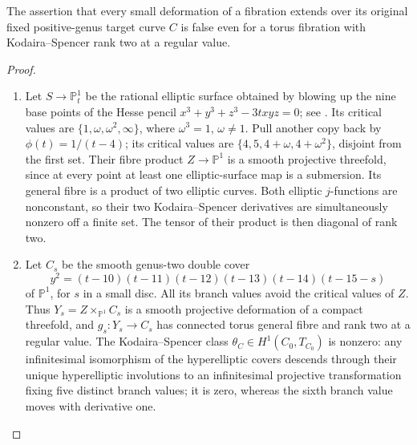 \begin{proposition}\hypertarget{tag-01GH}{}\label{cdp:st:E10}

The assertion that every small deformation of a fibration extends
over its original fixed positive-genus target curve $C$ is false even for a torus
fibration with Kodaira--Spencer rank two at a regular value.
\end{proposition}


\begin{proof}

\begin{enumerate}[label=\arabic*.,leftmargin=*]
\item Let $S\to\mathbb P^1_t$ be the rational elliptic surface obtained
by blowing up the nine base points of the Hesse pencil
$x^3+y^3+z^3-3txyz=0$; see \citet[\S2, pp.~238--241]{ArtebaniDolgachev2009}. Its critical values are
$\{1,\omega,\omega^2,\infty\}$, where $\omega^3=1$, $\omega\ne1$.
Pull another copy back by $\phi(t)=1/(t-4)$; its critical values
are $\{4,5,4+\omega,4+\omega^2\}$, disjoint from the first set.
Their fibre product $Z\to\mathbb P^1$ is a smooth projective
threefold, since at every point at least one elliptic-surface
map is a submersion. Its general fibre is a product of two
elliptic curves. Both elliptic $j$-functions are nonconstant,
so their two Kodaira--Spencer derivatives are simultaneously
nonzero off a finite set. The tensor of their product is then
diagonal of rank two.

\item Let $C_s$ be the smooth genus-two double cover
\[
 y^2=(t-10)(t-11)(t-12)(t-13)(t-14)(t-15-s)
\]
of $\mathbb P^1$, for $s$ in a small disc. All its branch values
avoid the critical values of $Z$. Thus
$Y_s=Z\times_{\mathbb P^1}C_s$ is a smooth projective deformation
of a compact threefold, and $g_s:Y_s\to C_s$ has connected torus
general fibre and rank two at a regular value. The Kodaira--Spencer
class $\theta_C\in H^1(C_0,T_{C_0})$ is nonzero: any infinitesimal
isomorphism of the hyperelliptic covers descends through their
unique hyperelliptic involutions to an infinitesimal projective
transformation fixing five distinct branch values; it is zero,
whereas the sixth branch value moves with derivative one.


\end{enumerate}
\end{proof}

